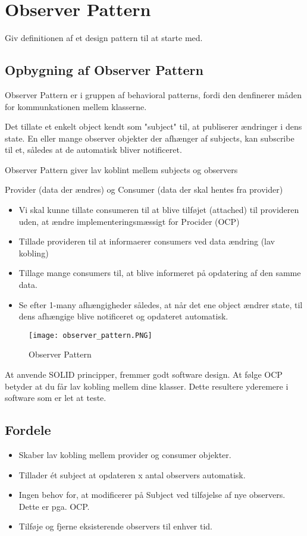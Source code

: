 \documentclass[../SWD_disp.tex]{subfiles}
\begin{document}
\section{Observer Pattern}

Giv definitionen af et design pattern til at starte med.

\subsection{Opbygning af Observer Pattern}
Observer Pattern er i gruppen af behavioral patterns, fordi den denfinerer måden for kommunkationen mellem klasserne.


Det tillate et enkelt object kendt som "subject" til, at publiserer ændringer i dens state. En eller mange observer objekter der afhænger af subjects, kan subscribe til et, således at de automatisk bliver notificeret.


Observer Pattern giver lav koblint mellem subjects og observers


Provider (data der ændres) og Consumer (data der skal hentes fra provider)
\begin{itemize}
    \item Vi skal kunne tillate consumeren til at blive tilføjet (attached) til provideren uden, at ændre implementeringsmæssigt for Procider (OCP)
    \item Tillade provideren til at informaerer consumers ved data ændring (lav kobling)
    \item Tillage mange consumers til, at blive informeret på opdatering af den samme data.
    \item Se efter 1-many afhængigheder således, at når det ene object ændrer state, til dens afhængige blive notificeret og opdateret automatisk.
\end{itemize}

\begin{figure}[H]
    \centering
    \texttt{[image: observer\_pattern.PNG]}
    \caption{Observer Pattern}
    \label{fig:observer_pattern}
\end{figure}

At anvende SOLID principper, fremmer godt software design. At følge OCP betyder at du får lav kobling mellem dine klasser. Dette resultere yderemere i software som er let at teste.

\subsection*{Fordele}
\begin{itemize}
    \item Skaber lav kobling mellem provider og consumer objekter.
    \item Tillader ét subject at opdateren x antal observers automatisk. 
    \item Ingen behov for, at modificerer på Subject ved tilføjelse af nye observers. Dette er pga. OCP.
    \item Tilføje og fjerne eksisterende observers til enhver tid.
\end{itemize}
\end{document}
